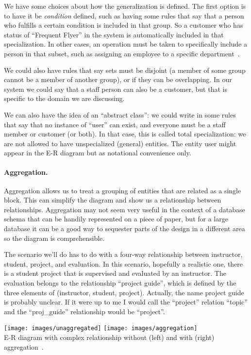 \documentclass[a4paper]{report}
\begin{document}
We have some choices about how the generalization is defined. The first option is to have it be \textit{condition} defined, such as having some rules that say that a person who fulfills a certain condition is included in that group. So a customer who has status of ``Frequent Flyer'' in the system is automatically included in that specialization. In other cases, an operation must be taken to specifically include a person in that subset, such as assigning an employee to a specific department~\cite{dsc}. 

We could also have rules that say sets must be disjoint (a member of some group cannot be a member of another group), or if they can be overlapping. In our system we could say that a staff person can also be a customer, but that is specific  to the domain we are discussing. 

We can also have the idea of an ``abstract class'': we could write in some rules that say that no instance of ``user'' can exist, and everyone must be a staff member or customer (or both). In that case, this is called total specialization: we are not allowed to have unspecialized (general) entities. The entity user might appear in the E-R diagram but as notational convenience only.

\paragraph{Aggregation.} 

Aggregation allows us to treat a grouping of entities that are related as a single block. This can simplify the diagram and show us a relationship between relationships. Aggregation may not seem very useful in the context of a database schema that can be handily represented on a piece of paper, but for a large database it can be a good way to sequester parts of the design in a different area so the diagram is comprehensible.

The scenario we'll do has to do with a four-way relationship between instructor, student, project, and evaluation. In this scenario, hopefully a realistic one, there is a student project that is supervised and evaluated by an instructor. The evaluation belongs to the relationship ``project guide'', which is defined by the three elements of (instructor, student, project). Actually, the name project guide is probably unclear. If it were up to me I would call the ``project'' relation ``topic'' and the ``proj\_guide'' relationship would be ``project''. 

\begin{center}
\texttt{[image: images/unaggregated]}
\texttt{[image: images/aggregation]}\\
E-R diagram with complex relationship without (left) and with (right) aggregation~\cite{dsc}.
\end{center}
\end{document}
